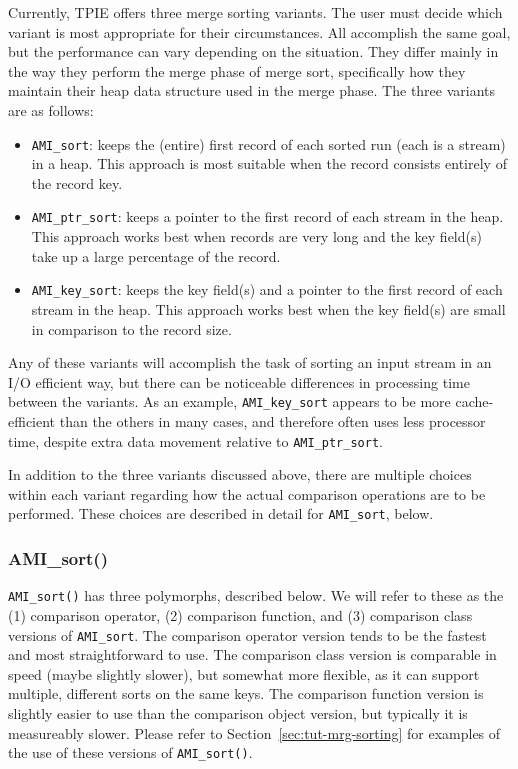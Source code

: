 Currently, TPIE offers three merge sorting variants. The
user must decide which variant is most appropriate for their
circumstances.  All accomplish the same goal, but the
performance can vary depending on the situation. They differ
mainly in the way they perform the merge phase of merge
sort, specifically how they maintain their heap data
structure used in the merge phase. The three variants are as
follows:
\begin{itemize}
    \item \lstinline|AMI_sort|: keeps the (entire) first record
    of each sorted run (each is a stream) in a heap. This
    approach is most suitable when the record consists
    entirely of the record key.
    
    \item \lstinline|AMI_ptr_sort|: keeps a pointer to the
    first record of each stream in the heap. This approach
    works best when records are very long and the key
    field(s) take up a large percentage of the record.

    \item \lstinline|AMI_key_sort|: keeps the key field(s) and
    a pointer to the first record of each stream in the
    heap. This approach works best when the key field(s) are
    small in comparison to the record size.
\end{itemize}

Any of these variants will accomplish the task of sorting an
input stream in an I/O efficient way, but there can be
noticeable differences in processing time between the
variants. As an example, \lstinline|AMI_key_sort| appears to be
more cache-efficient than the others in many cases, and
therefore often uses less processor time, despite extra data
movement relative to \lstinline|AMI_ptr_sort|.

In addition to the three variants discussed above, there are
multiple choices within each variant regarding how the
actual comparison operations are to be performed. These
choices are described in detail for \lstinline|AMI_sort|, below.

\subsubsection{AMI\_sort()}
\lstinline|AMI_sort()| has three polymorphs, described below.
We will refer to these as the (1) comparison operator, (2)
comparison function, and (3) comparison class versions of
\lstinline|AMI_sort|. The comparison operator version tends to
be the fastest and most straightforward to use. The
comparison class version is comparable in speed (maybe
slightly slower), but somewhat more flexible, as it can support
multiple, different sorts on the same keys. The comparison
function version is slightly easier to use than the
comparison object version, but typically it is measureably slower.
Please refer to Section~\ref{sec:tut-mrg-sorting} for examples
of the use of these versions of \lstinline|AMI_sort()|.

